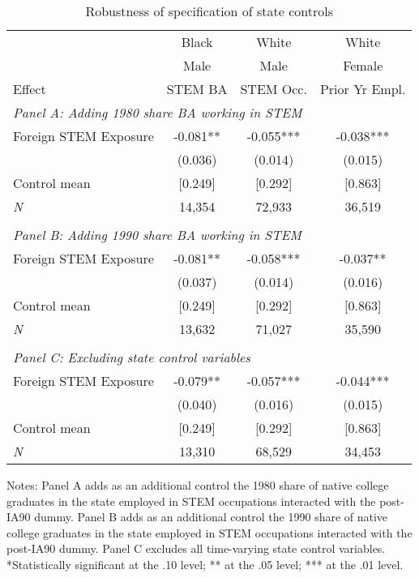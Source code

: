 \begin{table}[ht]
\caption{Robustness of specification of state controls}
\label{tab:ta3}
\centering
\begin{threeparttable}
\begin{tabular}{lccc}
\toprule 
       & Black           & White        & White       \\
       & Male            & Male         & Female      \\
Effect & STEM BA         & STEM Occ.    & Prior Yr Empl.\\
\midrule 
\multicolumn{4}{l}{\emph{Panel A: Adding 1980 share BA working in STEM}}\\ 
Foreign STEM Exposure & -0.081** & -0.055*** & -0.038*** \\ 
 &  (0.036)        & (0.014)        & (0.015) \\ 
Control mean &  [0.249]        & [0.292]       & [0.863] \\ 
\emph{N} &     14,354          &    72,933          &    36,519 \\ 
                         &                              &                              &\\
\multicolumn{4}{l}{\emph{Panel B: Adding 1990 share BA working in STEM}}\\ 
Foreign STEM Exposure & -0.081** & -0.058*** & -0.037** \\ 
 &  (0.037)        & (0.014)        & (0.016) \\ 
Control mean &  [0.249]        & [0.292]       & [0.863] \\ 
\emph{N} &     13,632          &    71,027          &    35,590 \\ 
                         &                              &                              &\\
\multicolumn{4}{l}{\emph{Panel C: Excluding state control variables}}\\ 
Foreign STEM Exposure & -0.079** & -0.057*** & -0.044*** \\ 
 &  (0.040)        & (0.016)        & (0.015) \\ 
Control mean &  [0.249]        & [0.292]       & [0.863] \\ 
\emph{N} &     13,310          &    68,529          &    34,453 \\ 
\bottomrule 
\end{tabular} 
\footnotesize Notes: Panel A adds as an additional control the 1980 share of native college graduates in the state employed in STEM occupations interacted with the post-IA90 dummy. Panel B adds as an additional control the 1990 share of native college graduates in the state employed in STEM occupations interacted with the post-IA90 dummy. Panel C excludes all time-varying state control variables. *Statistically significant at the .10 level; ** at the .05 level; *** at the .01 level.
\end{threeparttable} 
\end{table} 
